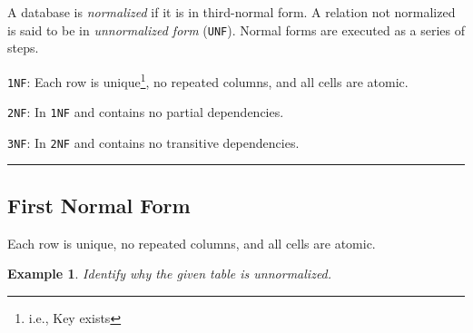 \documentclass{article}
\newtheorem{example}{Example}
\begin{document}
\noindent  A database is \textit{normalized} if it is in third-normal form.  A relation not normalized is said to be in \textit{unnormalized form} (\texttt{UNF}).  Normal forms are executed as a series of steps.  

%  
\begin{outline}[enumerate]
    
    \1 \texttt{1NF}: Each row is unique\footnote{i.e., Key exists}, no repeated columns, and all cells are atomic.  
    
    \1 \texttt{2NF}: In \texttt{1NF} and contains no partial dependencies.
    
    \1 \texttt{3NF}: In \texttt{2NF} and contains no transitive dependencies.
    
\end{outline}


 
\hspace{-0.5cm}\rule[-0.101in]{\textwidth}{0.0025in}
  
  













%   
\subsection*{First Normal Form} 

Each row is unique, no repeated columns, and all cells are atomic.

  \begin{example}
  Identify why the given table is unnormalized. 
\end{example}
\end{document}
